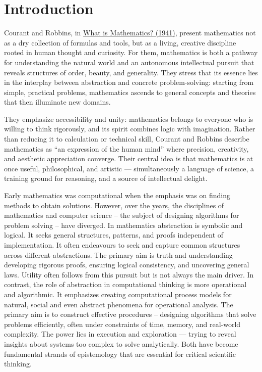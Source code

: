 \chapter{Introduction}
\label{chap:intro}


Courant and Robbins, in \href{https://en.wikipedia.org/wiki/What_Is_Mathematics\%3F}{What is Mathematics? (1941)}, present mathematics not as a dry collection of formulas and tools, but as a living, creative discipline rooted in human thought and curiosity. For them, mathematics is both a pathway for understanding the natural world and an autonomous intellectual pursuit that reveals structures of order, beauty, and generality. They stress that its essence lies in the interplay between abstraction and concrete problem-solving: starting from simple, practical problems, mathematics ascends to general concepts and theories that then illuminate new domains.

They emphasize accessibility and unity: mathematics belongs to everyone who is willing to think rigorously, and its spirit combines logic with imagination. Rather than reducing it to calculation or technical skill, Courant and Robbins describe mathematics as “an expression of the human mind” where precision, creativity, and aesthetic appreciation converge. Their central idea is that mathematics is at once useful, philosophical, and artistic — simultaneously a language of science, a training ground for reasoning, and a source of intellectual delight.

Early mathematics was computational when the emphasis was on finding methods to obtain solutions. However, over the years, the disciplines of mathematics and computer science -- the subject of designing algorithms for problem solving -- have diverged. In mathematics abstraction is symbolic and logical. It seeks general structures, patterns, and proofs independent of implementation. It often endeavours to seek and  capture  common structures across different abstractions. The primary aim is truth and understanding -- developing rigorous proofs, ensuring logical consistency, and uncovering general laws. Utility often follows from this pursuit but is not always the main driver. In contrast, the role of abstraction in computational thinking  is more operational and algorithmic. It emphasizes creating computational process models for natural, social and even abstract phenomena for operational analysis. The primary aim is to construct effective procedures -- designing algorithms that solve problems efficiently, often under constraints of time, memory, and real-world complexity. The power lies in execution and exploration — trying to  reveal insights about systems too complex to solve analytically.  Both have become fundamental strands of epistemology that are essential for critical scientific thinking.


